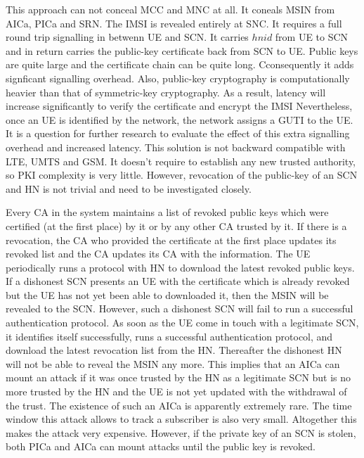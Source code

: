 \documentclass[lnicst,sechang,a4paper]{svmultln}
\begin{document}
This approach can not conceal MCC and MNC at all. It coneals MSIN from AICa, PICa and SRN. The IMSI is revealed entirely at SNC. It requires a full round trip signalling in betwenn UE and SCN. It carries $hnid$ from UE to SCN and in return carries the public-key certificate back from SCN to UE. Public keys are quite large and the certificate chain can be quite long. Cconsequently it adds signficant signalling overhead. Also, public-key cryptography is computationally heavier than that of symmetric-key cryptography. As a result, latency will increase significantly to verify the certificate and encrypt the IMSI Nevertheless, once an UE is identified by the network, the network assigns a GUTI to the UE. It is a question for further research to evaluate the effect of this extra signalling overhead and increased latency. This solution is not backward compatible with LTE, UMTS and GSM. It doesn't require to establish any new trusted authority, so PKI complexity is very little. However, revocation of the public-key of an SCN and HN is not trivial and need to be investigated closely.

Every CA in the system maintains a list of revoked public keys which were certified (at the first place) by it or by any other CA trusted by it. If there is a revocation, the CA who provided the certificate at the first place updates its revoked list and the CA updates its CA with the information. The UE periodically runs a protocol with HN to download the latest revoked public keys. If a dishonest SCN presents an UE with the certificate which is already revoked but the UE has not yet been able to downloaded it, then the MSIN will be revealed to the SCN. However, such a dishonest SCN will fail to run a successful authentication protocol. As soon as the UE come in touch with a legitimate SCN, it identifies itself successfully, runs a successful authentication protocol, and download the latest revocation list from the HN. Thereafter the dishonest HN will not be able to reveal the MSIN any more. This implies that an AICa can mount an attack if it was once trusted by the HN as a legitimate SCN but is no more trusted by the HN and the UE is not yet updated with the withdrawal of the trust. The existence of such an AICa is apparently extremely rare. The time window this attack allows to track a subscriber is also very small. Altogether this makes the attack very expensive. However, if the private key of an SCN is stolen, both PICa and AICa can mount attacks until the public key is revoked. 
\end{document}
